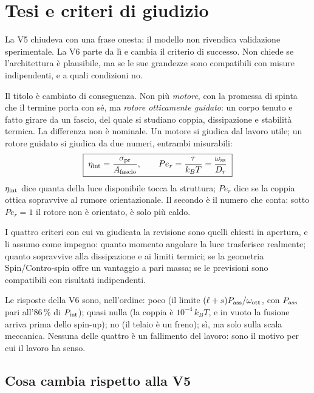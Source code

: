 \documentclass[11pt,a4paper]{article}
\begin{document}
\tableofcontents
\newpage

\section{Tesi e criteri di giudizio}

La V5 chiudeva con una frase onesta: il modello non rivendica validazione
sperimentale. La V6 parte da l\`i e cambia il criterio di successo. Non chiede se
l'architettura \`e plausibile, ma se le sue grandezze sono compatibili con misure
indipendenti, e a quali condizioni no.

Il titolo \`e cambiato di conseguenza. Non pi\`u \emph{motore}, con la promessa di
spinta che il termine porta con s\'e, ma \emph{rotore otticamente guidato}: un corpo
tenuto e fatto girare da un fascio, del quale si studiano coppia, dissipazione e
stabilit\`a termica. La differenza non \`e nominale. Un motore si giudica dal lavoro
utile; un rotore guidato si giudica da due numeri, entrambi misurabili:
\begin{equation}
\boxed{\;\eta_{\rm int}=\frac{\sigma_{\rm pr}}{A_{\rm fascio}},
\qquad
Pe_r=\frac{\tau}{k_BT}=\frac{\omega_{\rm ss}}{D_r}\;}
\label{eq:merito}
\end{equation}
$\eta_{\rm int}$ dice quanta della luce disponibile tocca la struttura; $Pe_r$ dice
se la coppia ottica sopravvive al rumore orientazionale. Il secondo \`e il numero che
conta: sotto $Pe_r=1$ il rotore non \`e orientato, \`e solo pi\`u caldo.

I quattro criteri con cui va giudicata la revisione sono quelli chiesti in apertura,
e li assumo come impegno: quanto momento angolare la luce trasferisce realmente;
quanto sopravvive alla dissipazione e ai limiti termici; se la geometria
Spin/Contro-spin offre un vantaggio a pari massa; se le previsioni sono compatibili
con risultati indipendenti.

Le risposte della V6 sono, nell'ordine: poco (il limite
$(\ell+s)P_{\rm ass}/\omega_{\rm ott}$, con $P_{\rm ass}$ pari all'86\,\% di
$P_{\rm int}$); quasi nulla (la coppia \`e $10^{-4}\,k_BT$, e in vuoto la fusione
arriva prima dello spin-up); no (il telaio \`e un freno); s\`i, ma solo sulla scala
meccanica. Nessuna delle quattro \`e un fallimento del lavoro: sono il motivo per cui
il lavoro ha senso.

\subsection{Cosa cambia rispetto alla V5}
\end{document}

